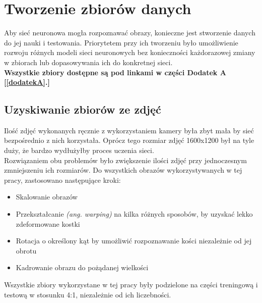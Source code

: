 
\chapter{Tworzenie zbiorów danych}
Aby sieć neuronowa mogła rozpoznawać obrazy, konieczne jest stworzenie danych
do jej nauki i testowania. Priorytetem przy ich tworzeniu było
umożliwienie rozwoju różnych modeli sieci neuronowych bez konieczności każdorazowej
zmiany w zbiorach lub dopasowywania ich do konkretnej sieci.\\
\textbf{Wszystkie zbiory dostępne są pod linkami w części Dodatek A [\ref{dodatekA}.] }

\section{Uzyskiwanie zbiorów ze zdjęć}
Ilość zdjęć wykonanych ręcznie z wykorzystaniem kamery była zbyt mała by sieć bezpośrednio
z nich korzystała. Oprócz tego rozmiar zdjęć 1600x1200 był na tyle duży, że bardzo wydłużyłby
proces uczenia sieci.\\
Rozwiązaniem obu problemów było zwiększenie ilości zdjęć przy jednoczesnym zmniejszeniu
ich rozmiarów. Do wszystkich obrazów wykorzystywanych w tej pracy, zastosowano następujące
kroki:
\begin{itemize}
\item Skalowanie obrazów
\item Przekształcanie \textit{(ang. warping)} na kilka różnych sposobów, by uzyskać lekko zdeformowane kostki
\item Rotacja o określony kąt by umożliwić rozpoznawanie kości niezależnie od jej obrotu
\item Kadrowanie obrazu do pożądanej wielkości
\end{itemize}
Wszystkie zbiory wykorzystane w tej pracy były podzielone na części treningową i testową
w stosunku 4:1, niezależnie od ich liczebności.

